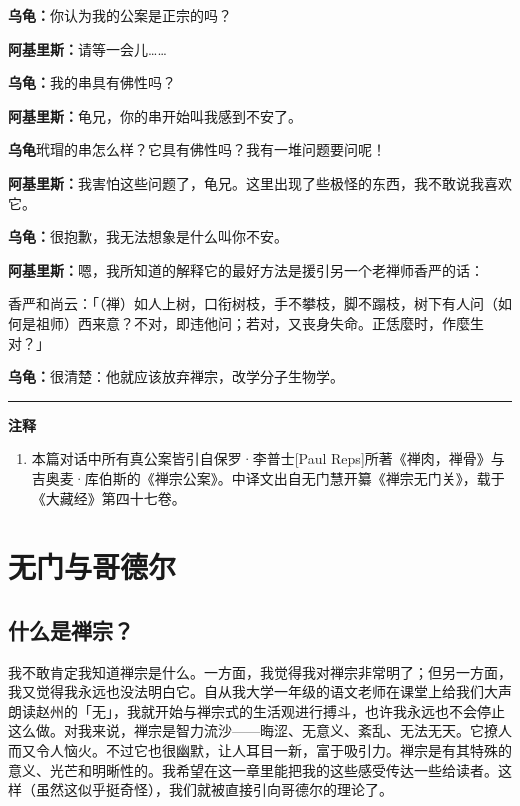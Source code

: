 \documentclass[
  12pt,
  twoside,
  openright,
  oldfontcommands,
]{memoir}
\newcommand{\dialogname}[1]{{\heifamily\bfseries #1}}
\begin{document}
\dialogname{乌龟：}你认为我的公案是正宗的吗？

\dialogname{阿基里斯：}请等一会儿\ldots\ldots{}

\dialogname{乌龟：}我的串具有佛性吗？

\dialogname{阿基里斯：}龟兄，你的串开始叫我感到不安了。

\dialogname{乌龟}玳瑁的串怎么样？它具有佛性吗？我有一堆问题要问呢！

\dialogname{阿基里斯：}我害怕这些问题了，龟兄。这里出现了些极怪的东西，我不敢说我喜欢它。

\dialogname{乌龟：}很抱歉，我无法想象是什么叫你不安。

\dialogname{阿基里斯：}嗯，我所知道的解释它的最好方法是援引另一个老禅师香严的话：

香严和尚云：「{（禅）}如人上树，口衔树枝，手不攀枝，脚不蹋枝，树下有人问{（如何是祖师）}西来意？不对，即违他问；若对，又丧身失命。正恁麼时，作麼生对？」

\dialogname{乌龟：}很清楚：他就应该放弃禅宗，改学分子生物学。

{\footnotesize\setlength{\parindent}{0pt}%
\noindent\textcolor{rulegray}{\rule{0.35\linewidth}{0.3pt}}\par\vspace{2pt}
\noindent\textbf{注释}\par\vspace{3pt}
\begin{enumerate}
\label{fn:Dialog09-1}{}
\item 本篇对话中所有真公案皆引自保罗·李普士[Paul Reps]所著《禅肉，禅骨》与吉奥麦·库伯斯的《禅宗公案》。中译文出自无门慧开纂《禅宗无门关》，载于《大藏经》第四十七卷。
\end{enumerate}
}

\label{Chapter09.xhtml}{}

\chapter{无门与哥德尔}

\section{什么是禅宗？}

我不敢肯定我知道禅宗是什么。一方面，我觉得我对禅宗非常明了；但另一方面，我又觉得我永远也没法明白它。自从我大学一年级的语文老师在课堂上给我们大声朗读赵州的「无」，我就开始与禅宗式的生活观进行搏斗，也许我永远也不会停止这么做。对我来说，禅宗是智力流沙------晦涩、无意义、紊乱、无法无天。它撩人而又令人恼火。不过它也很幽默，让人耳目一新，富于吸引力。禅宗是有其特殊的意义、光芒和明晰性的。我希望在这一章里能把我的这些感受传达一些给读者。这样（虽然这似乎挺奇怪），我们就被直接引向哥德尔的理论了。
\end{document}
